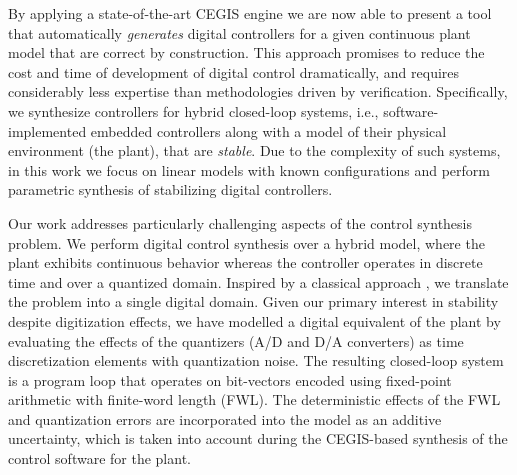 \documentclass{sig-alternate-05-2015}
\begin{document}
By applying a state-of-the-art CEGIS engine we are now able to present a
tool that automatically \emph{generates} digital controllers for a given
continuous plant model that are correct by construction.  This approach promises to
reduce the cost and time of development of digital control dramatically, and
requires considerably less expertise than methodologies driven by
verification.  Specifically, we synthesize controllers for hybrid
closed-loop systems, i.e., software-implemented embedded controllers along
with a model of their physical environment (the plant), that are
\emph{stable}.  Due to the complexity of such systems, in this work we focus on linear
models with known configurations and perform parametric synthesis of stabilizing digital controllers.

Our work addresses particularly challenging aspects of the control synthesis
problem.  We perform digital control synthesis over a hybrid model, where
the plant exhibits continuous behavior whereas the controller operates in 
discrete time and over a quantized domain.  
Inspired by a classical approach \cite{astrom1997computer}, 
we translate the problem into a single digital domain.  
Given our primary interest in stability despite digitization effects, we have modelled
a digital equivalent of the plant by evaluating the effects of the
quantizers (A/D and D/A converters) as time discretization elements with
quantization noise.  The resulting closed-loop system is a program loop that
operates on bit-vectors encoded using fixed-point arithmetic with finite-word
length (FWL). The deterministic effects of the FWL and
quantization errors are incorporated into the model as an additive
uncertainty, which is taken into account during the CEGIS-based synthesis of
the control software for the plant.
\end{document}
